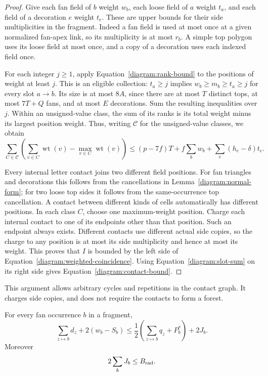 \begin{proof}
Give each fan field of $b$ weight $w_b$, each loose field of $a$ weight
$t_a$, and each field of a decoration $e$ weight $t_e$.  These are
upper bounds for their side multiplicities in the fragment.  Indeed a
fan field is used at most once at a given normalized fan-apex link, so
its multiplicity is at most $r_b$.  A simple top polygon uses its loose
field at most once, and a copy of a decoration uses each indexed field
once.

For each integer $j\ge1$, apply
Equation~\eqref{diagram:rank-bound} to the positions of weight at least
$j$.  This is an eligible collection: $t_a\ge j$ implies
$w_b\ge m_b\ge t_a\ge j$ for every slot $a\to b$.  Its size is at most
$8A$, since there are at most $T$ distinct tops, at most $7T+Q$ fans,
and at most $E$ decorations.  Sum the resulting inequalities over $j$.
Within an unsigned-value class, the sum of its ranks is its total
weight minus its largest position weight.  Thus, writing
$\mathcal C$ for the unsigned-value classes, we obtain
\begin{equation}\label{diagram:weighted-coincidence}
 \sum_{C\in\mathcal C}
 \left(\sum_{v\in C}\operatorname{wt}(v)
                  -\max_{v\in C}\operatorname{wt}(v)\right)
 \le (p-7f)T+f\sum_b w_b+\sum_e(h_e-\delta)t_e.
\end{equation}

Every internal letter contact joins two different field positions.
For fan triangles and decorations this follows from the cancellations
in Lemma~\ref{diagram:normal-form}; for two loose top sides it follows
from the same-occurrence top cancellation.  A contact between different
kinds of cells automatically has different positions.  In each class
$C$, choose one maximum-weight position.  Charge each internal contact
to one of its endpoints other than that position.  Such an endpoint
always exists.  Different contacts use different actual side copies,
so the charge to any position is at most its side multiplicity and
hence at most its weight.  This proves that $I$ is bounded by the left
side of Equation~\eqref{diagram:weighted-coincidence}.  Using
Equation~\eqref{diagram:slot-sum} on its right side gives
Equation~\eqref{diagram:contact-bound}.
\end{proof}

This argument allows arbitrary cycles and repetitions in the contact
graph.  It charges side copies, and does not require the contacts to
form a forest.

\begin{lemma}\label{diagram:apex}
For every fan occurrence $b$ in a fragment,
\begin{equation}\label{diagram:apex-bound}
 \sum_{z\mapsto b}d_z+2(w_b-S_b)
 \le \frac12\left(\sum_{z\mapsto b}q_z+P_b^*\right)+2J_b.
\end{equation}
Moreover
\begin{equation}\label{diagram:partial-bound}
 2\sum_bJ_b\le B_{\rm rad}.
\end{equation}
\end{lemma}

